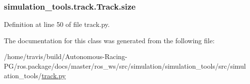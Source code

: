 \subsubsection[{\texorpdfstring{size}{size}}]{\setlength{\rightskip}{0pt plus 5cm}simulation\+\_\+tools.\+track.\+Track.\+size}\hypertarget{classsimulation__tools_1_1track_1_1_track_a69be8807eecacfd98981e206ea3a003f}{}\label{classsimulation__tools_1_1track_1_1_track_a69be8807eecacfd98981e206ea3a003f}


Definition at line 50 of file track.\+py.



The documentation for this class was generated from the following file\+:\begin{DoxyCompactItemize}
\item 
/home/travis/build/\+Autonomous-\/\+Racing-\/\+P\+G/ros.\+package/docs/master/ros\+\_\+ws/src/simulation/simulation\+\_\+tools/src/simulation\+\_\+tools/\hyperlink{track_8py}{track.\+py}\end{DoxyCompactItemize}
